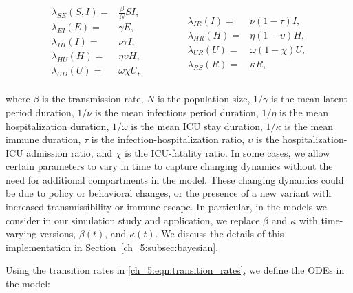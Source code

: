 \begin{equation}
\begin{aligned}
\lambda_{SE}(S, I)  =&  \frac{\beta}{N} S I,   \\
\lambda_{EI}(E)  =& \gamma E,    \\
\lambda_{IH}(I)  =& \nu \tau I,   \\
\lambda_{HU}(H)  =& \eta  \upsilon H,   \\
\lambda_{UD}(U)  =& \omega \chi U, \\
\end{aligned}
\qquad \quad \quad
\begin{aligned}
\lambda_{IR}(I)  =& \nu \left(1 - \tau \right) I,   \\
\lambda_{HR}(H)  =& \eta \left(1 - \upsilon \right) H, \\
\lambda_{UR}(U)  =& \omega \left( 1 - \chi \right) U,    \\
\lambda_{RS}(R)  =& \kappa R,
\end{aligned}
\label{ch_5:eqn:transition_rates}
\end{equation}

where \( \beta \) is the transmission rate, \( N \) is the population size, \( 1 / \gamma  \) is the mean latent period duration, \( 1 / \nu \) is the mean infectious period duration, \( 1 / \eta \) is the mean hospitalization duration, \( 1 / \omega \) is the mean ICU stay duration, \( 1 / \kappa \) is the mean immune duration, \( \tau \) is the infection-hospitalization ratio, \( \upsilon \) is the hospitalization-ICU admission ratio, and \( \chi \) is the ICU-fatality ratio.
In some cases, we allow certain parameters to vary in time to capture changing dynamics without the need for additional compartments in the model.
These changing dynamics could be due to policy or behavioral changes, or the presence of a new variant with increased transmissibility or immune escape.
In particular, in the models we consider in our simulation study and application, we replace \( \beta \) and \( \kappa \) with time-varying versions, \( \beta(t) \), and \( \kappa(t) \).
We discuss the details of this implementation in Section~\ref{ch_5:subsec:bayesian}.

Using the transition rates in \eqref{ch_5:eqn:transition_rates}, we define the ODEs in the model:

